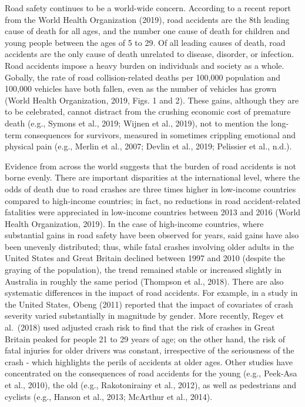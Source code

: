 \documentclass[]{elsarticle} %
\begin{document}
Road safety continues to be a world-wide concern. According to a recent
report from the World Health Organization (2019), road accidents are the
8th leading cause of death for all ages, and the number one cause of
death for children and young people between the ages of 5 to 29. Of all
leading causes of death, road accidents are the only cause of death
unrelated to disease, disorder, or infection. Road accidents impose a
heavy burden on individuals and society as a whole. Gobally, the rate of
road collision-related deaths per 100,000 population and 100,000
vehicles have both fallen, even as the number of vehicles has grown
(World Health Organization, 2019, Figs. 1 and 2). These gains, although
they are to be celebrated, cannot distract from the crushing economic
cost of premature death (e.g., Symons et al., 2019; Wijnen et al.,
2019), not to mention the long-term consequences for survivors, measured
in sometimes crippling emotional and physical pain (e.g., Merlin et al.,
2007; Devlin et al., 2019; Pelissier et al., n.d.).

Evidence from across the world suggests that the burden of road
accidents is not borne evenly. There are important disparities at the
international level, where the odds of death due to road crashes are
three times higher in low-income countries compared to high-income
countries; in fact, no reductions in road accident-related fatalities
were appreciated in low-income countries between 2013 and 2016 (World
Health Organization, 2019). In the case of high-income countries, where
substantial gains in road safety have been observed for years, said
gains have also been unevenly distributed; thus, while fatal crashes
involving older adults in the United States and Great Britain declined
between 1997 and 2010 (despite the graying of the population), the trend
remained stable or increased slightly in Australia in roughly the same
period (Thompson et al., 2018). There are also systematic differences in
the impact of road accidents. For example, in a study in the United
States, Obeng (2011) reported that the impact of covariates of crash
severity varied substantially in magnitude by gender. More recently,
Regev et al.~(2018) used adjusted crash risk to find that the risk of
crashes in Great Britain peaked for people 21 to 29 years of age; on the
other hand, the risk of fatal injuries for older drivers was constant,
irrespective of the seriousness of the crash - which highlights the
perils of accidents at older ages. Other studies have concentrated on
the consequences of road accidents for the young (e.g., Peek-Asa et al.,
2010), the old (e.g., Rakotonirainy et al., 2012), as well as
pedestrians and cyclists (e.g., Hanson et al., 2013; McArthur et al.,
2014).
\end{document}

